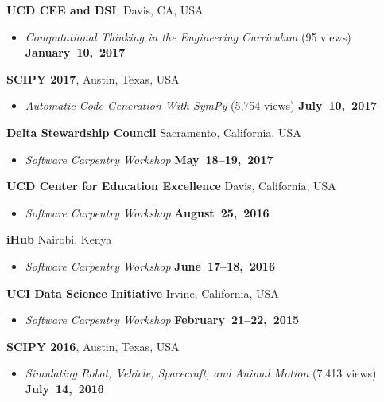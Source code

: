 \documentclass[10pt]{article}
\newenvironment{outerlist}[1][\enskip\textbullet]%
        {\begin{itemize}[#1]}{\end{itemize}%
         \vspace{-.6\baselineskip}}
\newcommand{\blankline}{\quad\pagebreak[2]}
\begin{document}
\blankline

\textbf{UCD CEE and DSI}, Davis, CA, USA
\begin{outerlist}
  \item[] \textit{Computational Thinking in the Engineering Curriculum} (95
    views)
    \hfill \textbf{January~10,~2017}
\end{outerlist}

\blankline

\textbf{SCIPY 2017}, Austin, Texas, USA
\begin{outerlist}
  \item[] \textit{Automatic Code Generation With SymPy} (5,754 views)
    \hfill \textbf{July~10,~2017}
\end{outerlist}

\blankline

\textbf{Delta Stewardship Council} Sacramento, California, USA
\begin{outerlist}
  \item[] \textit{Software Carpentry Workshop}
    \hfill \textbf{May~18--19,~2017}
\end{outerlist}

\blankline

\textbf{UCD Center for Education Excellence} Davis, California, USA
\begin{outerlist}
  \item[] \textit{Software Carpentry Workshop}
    \hfill \textbf{August~25,~2016}
\end{outerlist}

\blankline

\textbf{iHub} Nairobi, Kenya
\begin{outerlist}
  \item[] \textit{Software Carpentry Workshop}
    \hfill \textbf{June~17--18,~2016}
\end{outerlist}

\blankline

\textbf{UCI Data Science Initiative} Irvine, California, USA
\begin{outerlist}
  \item[] \textit{ Software Carpentry Workshop}
    \hfill \textbf{February~21--22,~2015}
\end{outerlist}

\blankline

\textbf{SCIPY 2016}, Austin, Texas, USA
\begin{outerlist}
\item[] \textit{Simulating Robot, Vehicle, Spacecraft, and Animal Motion} (7,413 views)
    \hfill \textbf{July~14,~2016}
\end{outerlist}
\end{document}

